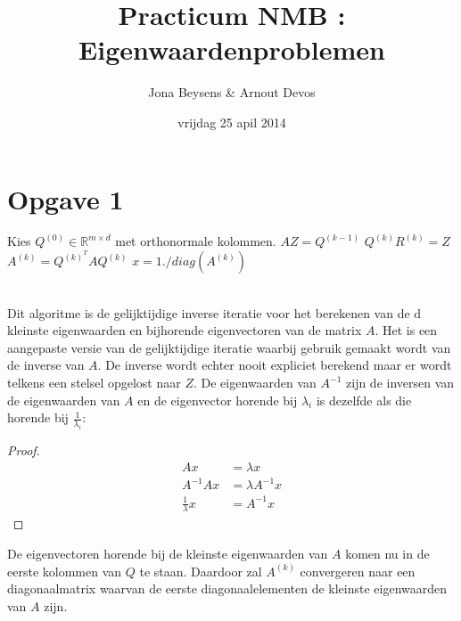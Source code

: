 \documentclass[a4paper]{article}
\title{Practicum NMB : Eigenwaardenproblemen}
\author{Jona Beysens \& Arnout Devos}
\date{vrijdag 25 apil 2014}
\newcommand{\opgave}[1]{\section*{Opgave #1}}
\begin{document}
\maketitle

\opgave{1}

\begin{algorithmic}
\State Kies $Q^{(0)} \in \mathbb{R}^{m\times d}$ met orthonormale kolommen.
    \State $AZ=Q^{(k-1)}$
    \State $Q^{(k)}R^{(k)}=Z$
    \State $A^{(k)}=Q^{(k)^{T}}AQ^{(k)}$
\EndFor
\State $x = 1./diag(A^{(k)})$
\end{algorithmic}
\ \\
Dit algoritme is de gelijktijdige inverse iteratie voor het berekenen van de d kleinste eigenwaarden en bijhorende eigenvectoren van de matrix $A$. Het is een aangepaste versie van de gelijktijdige iteratie waarbij gebruik gemaakt wordt van de inverse van $A$. De inverse wordt echter nooit expliciet berekend maar er wordt telkens een stelsel opgelost naar $Z$. De eigenwaarden van $A^{-1}$ zijn de inversen van de eigenwaarden van $A$ en de eigenvector horende bij $\lambda_i$ is dezelfde als die horende bij $\frac{1}{\lambda_i}$:
\begin{proof}
\begin{align}
	Ax &= \lambda x \label{eq1}\\ 
    A^{-1}Ax &= \lambda A^{-1}x \label{eq2}\\
    \frac{1}{\lambda}x &= A^{-1}x \label{eq:const1}
\end{align}
\end{proof}
De eigenvectoren horende bij de kleinste eigenwaarden van $A$ komen nu in de eerste kolommen van $Q$ te staan. Daardoor zal $A^{(k)}$ convergeren naar een diagonaalmatrix waarvan de eerste diagonaalelementen de kleinste eigenwaarden van $A$ zijn.
\end{document}

